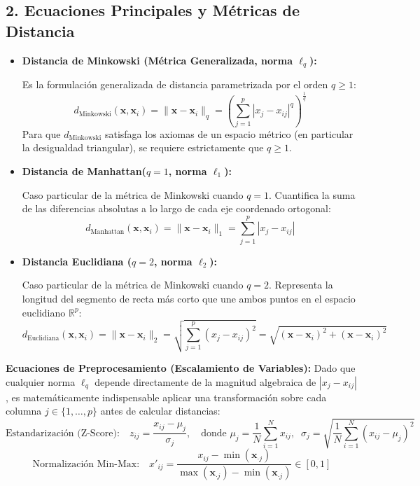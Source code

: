 \documentclass[11pt, a4paper]{article}
\begin{document}
\subsection*{2. Ecuaciones Principales y Métricas de Distancia}

\begin{itemize}
    \item \textbf{Distancia de Minkowski (Métrica Generalizada, norma $\ell_q$):}
    
    Es la formulación generalizada de distancia parametrizada por el orden $q \ge 1$:
    \begin{equation}
        d_{\text{Minkowski}}(\mathbf{x}, \mathbf{x}_i) = \|\mathbf{x} - \mathbf{x}_i\|_q = \left( \sum_{j=1}^{p} |x_j - x_{ij}|^q \right)^{\frac{1}{q}}
    \end{equation}
    Para que $d_{\text{Minkowski}}$ satisfaga los axiomas de un espacio métrico (en particular la desigualdad triangular), se requiere estrictamente que $q \ge 1$.

    \item \textbf{Distancia de Manhattan($q = 1$, norma $\ell_1$):}
    
    Caso particular de la métrica de Minkowski cuando $q = 1$. Cuantifica la suma de las diferencias absolutas a lo largo de cada eje coordenado ortogonal:
    \begin{equation}
        d_{\text{Manhattan}}(\mathbf{x}, \mathbf{x}_i) = \|\mathbf{x} - \mathbf{x}_i\|_1 = \sum_{j=1}^{p} |x_j - x_{ij}|
    \end{equation}

    \item \textbf{Distancia Euclidiana ($q = 2$, norma $\ell_2$):}
    
    Caso particular de la métrica de Minkowski cuando $q = 2$. Representa la longitud del segmento de recta más corto que une ambos puntos en el espacio euclidiano $\mathbb{R}^p$:
    \begin{equation}
        d_{\text{Euclidiana}}(\mathbf{x}, \mathbf{x}_i) = \|\mathbf{x} - \mathbf{x}_i\|_2 = \sqrt{\sum_{j=1}^{p} (x_j - x_{ij})^2} = \sqrt{(\mathbf{x} - \mathbf{x}_i)^2 +(\mathbf{x} - \mathbf{x}_i)^2}
    \end{equation}
\end{itemize}

\textbf{Ecuaciones de Preprocesamiento (Escalamiento de Variables):} Dado que cualquier norma $\ell_q$ depende directamente de la magnitud algebraica de $|x_j - x_{ij}|$, es matemáticamente indispensable aplicar una transformación sobre cada columna $j \in \{1, \dots, p\}$ antes de calcular distancias:
\begin{equation}
    \text{Estandarización (Z-Score):} \quad z_{ij} = \frac{x_{ij} - \mu_j}{\sigma_j}, \quad \text{donde } \mu_j = \frac{1}{N}\sum_{i=1}^{N} x_{ij}, \;\; \sigma_j = \sqrt{\frac{1}{N}\sum_{i=1}^{N}(x_{ij}-\mu_j)^2}
\end{equation}
\begin{equation}
    \text{Normalización Min-Max:} \quad x'_{ij} = \frac{x_{ij} - \min(\mathbf{x}_{\cdot j})}{\max(\mathbf{x}_{\cdot j}) - \min(\mathbf{x}_{\cdot j})} \in [0, 1]
\end{equation}
\end{document}

